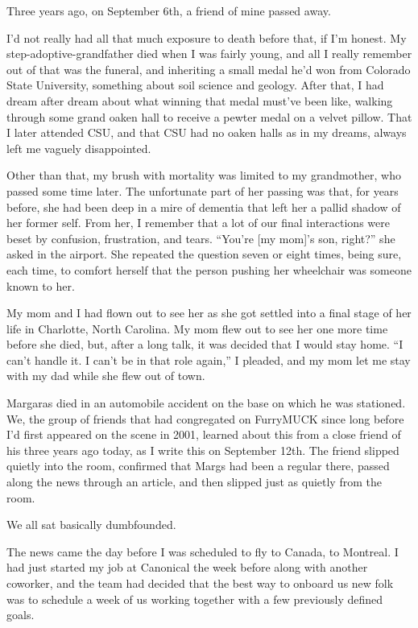 Three years ago, on September 6th, a friend of mine passed away.

I'd not really had all that much exposure to death before that, if I'm
honest. My step-adoptive-grandfather died when I was fairly young, and
all I really remember out of that was the funeral, and inheriting a
small medal he'd won from Colorado State University, something about
soil science and geology. After that, I had dream after dream about what
winning that medal must've been like, walking through some grand oaken
hall to receive a pewter medal on a velvet pillow. That I later attended
CSU, and that CSU had no oaken halls as in my dreams, always left me
vaguely disappointed.

Other than that, my brush with mortality was limited to my grandmother,
who passed some time later. The unfortunate part of her passing was
that, for years before, she had been deep in a mire of dementia that
left her a pallid shadow of her former self. From her, I remember that a
lot of our final interactions were beset by confusion, frustration, and
tears. ``You're {[}my mom{]}'s son, right?'' she asked in the airport.
She repeated the question seven or eight times, being sure, each time,
to comfort herself that the person pushing her wheelchair was someone
known to her.

My mom and I had flown out to see her as she got settled into a final
stage of her life in Charlotte, North Carolina. My mom flew out to see
her one more time before she died, but, after a long talk, it was
decided that I would stay home. ``I can't handle it. I can't be in that
role again,'' I pleaded, and my mom let me stay with my dad while she
flew out of town.

Margaras died in an automobile accident on the base on which he was
stationed. We, the group of friends that had congregated on FurryMUCK
since long before I'd first appeared on the scene in 2001, learned about
this from a close friend of his three years ago today, as I write this
on September 12th. The friend slipped quietly into the room, confirmed
that Margs had been a regular there, passed along the news through an
article, and then slipped just as quietly from the room.

We all sat basically dumbfounded.

The news came the day before I was scheduled to fly to Canada, to
Montreal. I had just started my job at Canonical the week before along
with another coworker, and the team had decided that the best way to
onboard us new folk was to schedule a week of us working together with a
few previously defined goals.

